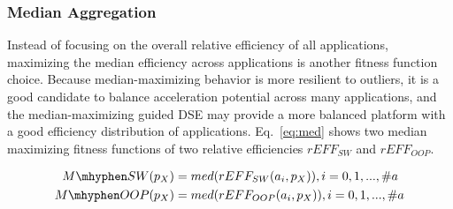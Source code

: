 \subsubsection{Median Aggregation}

Instead of focusing on the overall relative efficiency of all applications, maximizing the median efficiency across applications is another fitness function choice. 
Because median-maximizing behavior is more resilient to outliers, it is a good candidate to balance acceleration potential across many applications, and the median-maximizing guided DSE may provide a more balanced platform with a good efficiency distribution of applications. 
Eq.~\eqref{eq:med} shows two median maximizing fitness functions of two relative efficiencies $rEFF_{SW}$ and $rEFF_{OOP}$. 

\vspace{-4pt}
\begin{equation}
\begin{split}
	M\mhyphen SW (p_{X}) &= med(rEFF_{SW}(a_{i}, p_{X})),   i = 0,1,...,\#a \\
	M\mhyphen OOP (p_{X}) &= med(rEFF_{OOP}(a_{i}, p_{X})), i = 0,1,...,\#a
\label{eq:med}
\end{split}
\end{equation}